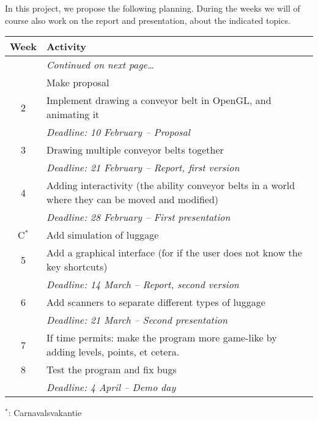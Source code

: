 In this project, we propose the following planning. During the weeks we will of course also work on the report and presentation, about the indicated topics.

\begin{longtabu} to 0.99
 \toprule
 \textbf{Week} & \textbf{Activity} \\
 \midrule
 \endhead
 \bottomrule
 & \vspace*{-5pt}\hfill\textit{Continued on next page\ldots} \\
 \endfoot
 \bottomrule
  & Make proposal \\
 2 & Implement drawing a conveyor belt in OpenGL, and animating it \\
   & \textit{Deadline: 10 February -- Proposal} \\
 3 & Drawing multiple conveyor belts together \\
   & \textit{Deadline: 21 February -- Report, first version} \\
 4 & Adding interactivity (the ability conveyor belts in a world where they can be moved and modified) \\
   & \textit{Deadline: 28 February -- First presentation} \\
 C$^\text{*}$ & Add simulation of luggage \\
 5 & Add a graphical interface (for if the user does not know the key shortcuts) \\
   & \textit{Deadline: 14 March -- Report, second version} \\
 6 & Add scanners to separate different types of luggage \\
   & \textit{Deadline: 21 March -- Second presentation} \\
 7 & If time permits: make the program more game-like by adding levels, points, et cetera. \\
 8 & Test the program and fix bugs \\
   & \textit{Deadline: 4 April -- Demo day} \\
\end{longtabu}
$^\text{*}$: Carnavalsvakantie

